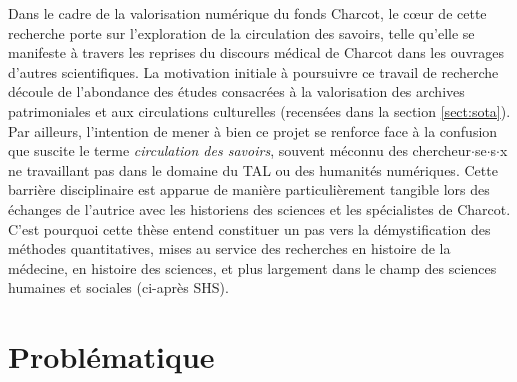 Dans le cadre de la valorisation numérique du fonds Charcot, le cœur de cette recherche porte sur l’exploration de la circulation des savoirs, telle qu’elle se manifeste à travers les reprises du discours médical de Charcot dans les ouvrages d’autres scientifiques. La motivation initiale à poursuivre ce travail de recherche découle de l’abondance des études consacrées à la valorisation des archives patrimoniales et aux circulations culturelles (recensées dans la section \ref{sect:sota}). Par ailleurs, l’intention de mener à bien ce projet se renforce face à la confusion que suscite le terme \textit{circulation des savoirs}, souvent méconnu des chercheur$\cdot$se$\cdot$s$\cdot$x ne travaillant pas dans le domaine du \textsc{TAL} ou des humanités numériques.
Cette barrière disciplinaire est apparue de manière particulièrement tangible lors des échanges de l’autrice avec les historiens des sciences et les spécialistes de Charcot. C’est pourquoi cette thèse entend constituer un pas vers la démystification des méthodes quantitatives, mises au service des recherches en histoire de la médecine, en histoire des sciences, et plus largement dans le champ des sciences humaines et sociales (ci-après \og{}\textsc{SHS}\fg{}).

\section{Problématique}

